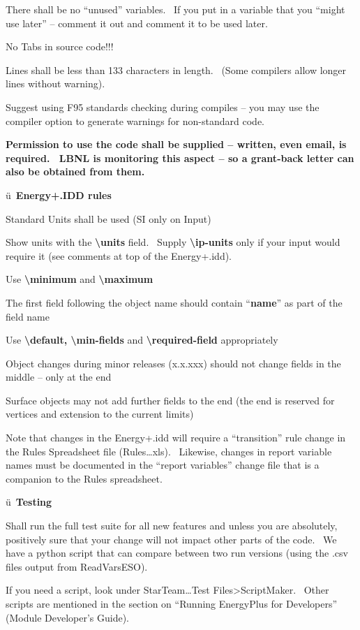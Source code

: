 There shall be no ``unused'' variables.~ If you put in a variable that you ``might use later'' -- comment it out and comment it to be used later.

No Tabs in source code!!!

Lines shall be less than 133 characters in length.~ (Some compilers allow longer lines without warning).

Suggest using F95 standards checking during compiles -- you may use the compiler option to generate warnings for non-standard code.

\textbf{Permission to use the code shall be supplied -- written, even email, is required.~ LBNL is monitoring this aspect -- so a grant-back letter can also be obtained from them.}

ü~\textbf{Energy+.IDD rules}

Standard Units shall be used (SI only on Input)

Show units with the \textbf{\textbackslash{}units} field.~ Supply \textbf{\textbackslash{}ip-units} only if your input would require it (see comments at top of the Energy+.idd).

Use \textbf{\textbackslash{}minimum} and \textbf{\textbackslash{}maximum}

The first field following the object name should contain ``\textbf{name}'' as part of the field name

Use \textbf{\textbackslash{}default, \textbackslash{}min-fields} and \textbf{\textbackslash{}required-field} appropriately

Object changes during minor releases (x.x.xxx) should not change fields in the middle -- only at the end

Surface objects may not add further fields to the end (the end is reserved for vertices and extension to the current limits)

Note that changes in the Energy+.idd will require a ``transition'' rule change in the Rules Spreadsheet file (Rules\ldots{}xls).~ Likewise, changes in report variable names must be documented in the ``report variables'' change file that is a companion to the Rules spreadsheet.

ü~\textbf{Testing}

Shall run the full test suite for all new features and unless you are absolutely, positively sure that your change will not impact other parts of the code.~ We have a python script that can compare between two run versions (using the .csv files output from ReadVarsESO).

If you need a script, look under StarTeam\ldots{}Test Files\textgreater{}ScriptMaker.~ Other scripts are mentioned in the section on ``Running EnergyPlus for Developers'' (Module Developer's Guide).

